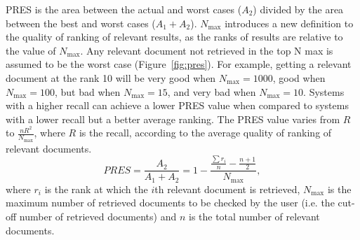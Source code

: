 PRES is the area between the actual and worst cases ($ A_{2} $) divided by the area between the best and worst cases ($ A_{1}+A_{2} $).
$ N_{\max} $ introduces a new definition to the quality of ranking of relevant results, as the ranks of results are relative to the value of $ N_{\max} $. Any relevant document not retrieved in the top N max is assumed to be the worst case (Figure~\ref{fig:pres}).
For example, getting a relevant document at the rank 10 will be very good when $ N_{\max}=1000 $, good when $ N_{\max}=100 $, but bad when $ N_{\max}=15 $, and very bad when $ N_{\max}=10 $. Systems with a higher recall can achieve a lower PRES value when compared to systems with a lower recall but a better average ranking. The PRES value varies from $ R $ to $ \frac{nR^{2}}{N_{\max}} $, where $ R $ is the recall, according to the average quality of ranking of relevant documents.
\begin{equation}
\label{eq:pres}
PRES=\frac{A_{2}}{A_{1}+A_{2}}=1-\frac{\frac{\sum r_{i}}{n}-\frac{n+1}{2}}{N_{\max}},
\end{equation}
where $ r_{i} $ is the rank at which the $ i $th relevant document is retrieved, $ N_{\max} $ is the maximum number of retrieved documents to be checked by the user (i.e. the cut-off number of retrieved documents) and $ n $ is the total number of relevant documents.